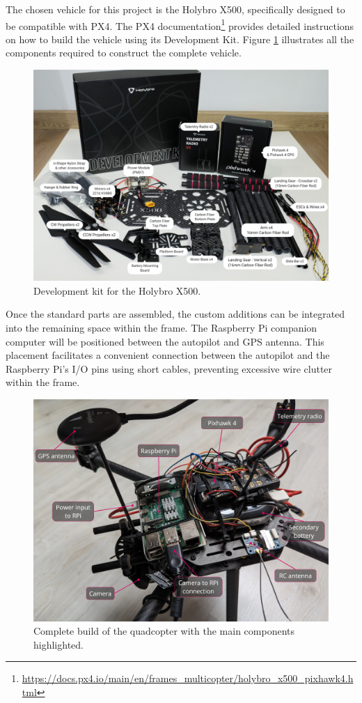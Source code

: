 The chosen vehicle for this project is the Holybro X500, specifically designed to be compatible with PX4. The PX4 documentation\footnote{\url{https://docs.px4.io/main/en/frames_multicopter/holybro_x500_pixhawk4.html}} provides detailed instructions on how to build the vehicle using its Development Kit. Figure \ref{fig:x500-dev-kit} illustrates all the components required to construct the complete vehicle.

\begin{figure}[H]
  \centering
  \includegraphics[width=.7\textwidth, keepaspectratio]{img/x500-dev-kit.jpg}
  \caption{Development kit for the Holybro X500.}
  \label{fig:x500-dev-kit}
\end{figure}


Once the standard parts are assembled, the custom additions can be integrated into the remaining space within the frame. The Raspberry Pi companion computer will be positioned between the autopilot and GPS antenna. This placement facilitates a convenient connection between the autopilot and the Raspberry Pi's I/O pins using short cables, preventing excessive wire clutter within the frame. 


\begin{figure}
  \centering
  \includegraphics[width=1\textwidth, keepaspectratio]{img/full-build.jpg}
  \caption{Complete build of the quadcopter with the main components highlighted.}\label{fig:full-build}
\end{figure}

